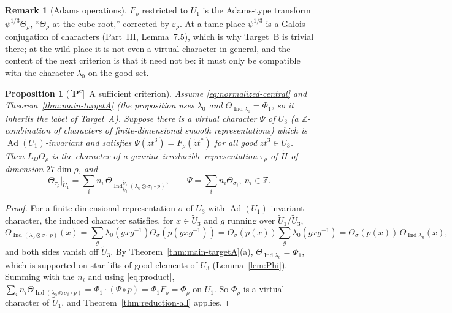 \documentclass[11pt]{article}
\newcommand{\Z}{\mathbb Z}
\newcommand{\Ind}{\operatorname{Ind}}
\newcommand{\Ad}{\operatorname{Ad}}
\newcommand{\tH}{\widetilde H}
\newcommand{\tU}{\widetilde U}
\newcommand{\Pctag}{\textnormal{\textbf{[P$^{\mathrm c}$]}}}
\theoremstyle{plain}
\newtheorem{proposition}[theorem]{Proposition}
\theoremstyle{definition}
\newtheorem{remark}[theorem]{Remark}
\begin{document}
\begin{remark}[Adams operations]
$F_\rho$ restricted to $\tU_1$ is the Adams-type transform
$\psi^{1/3}\Theta_\rho$, ``$\Theta_\rho$ at the cube root,'' corrected by
$\varepsilon_\rho$.  At a tame place $\psi^{1/3}$ is a Galois conjugation
of characters (Part~III, Lemma~7.5), which is why Target~B is trivial
there; at the wild place it is not even a virtual character in general,
and the content of the next criterion is that it need not be: it must
only be compatible with the character $\lambda_0$ on the good set.
\end{remark}

\begin{proposition}[\Pctag\ A sufficient criterion]\label{prop:criterion}
Assume \eqref{eq:normalized-central} and Theorem~\ref{thm:main-targetA}
(the proposition uses $\lambda_0$ and $\Theta_{\Ind\lambda_0}=\Phi_1$, so
it inherits the label of Target~A).  Suppose there is a virtual
character $\Psi$ of $U_3$ (a $\Z$-combination of characters of
finite-dimensional smooth representations) which is $\Ad(U_1)$-invariant
and satisfies $\Psi(zt^3)=F_\rho(\tilde zt^*)$ for all good $zt^3\in U_3$.
Then $L_D\Theta_\rho$ is the character of a genuine irreducible
representation $\tau_\rho$ of $\tH$ of dimension $27\dim\rho$, and
\begin{equation}\label{eq:tau-rho}
 \Theta_{\tau_\rho}|_{\tU_1}=\sum_i n_i\,\Theta_{\Ind_{\tU_3}^{\tU_1}(\lambda_0\otimes\sigma_i\circ p)},
 \qquad \Psi=\sum_i n_i\Theta_{\sigma_i},\ n_i\in\Z .
\end{equation}
\end{proposition}
\begin{proof}
For a finite-dimensional representation $\sigma$ of $U_3$ with
$\Ad(U_1)$-invariant character, the induced character satisfies, for
$x\in\tU_3$ and $g$ running over $\tU_1/\tU_3$,
\[
 \Theta_{\Ind(\lambda_0\otimes\sigma\circ p)}(x)=\sum_g\lambda_0(gxg^{-1})\Theta_\sigma(p(gxg^{-1}))
 =\Theta_\sigma(p(x))\sum_g\lambda_0(gxg^{-1})=\Theta_\sigma(p(x))\,\Theta_{\Ind\lambda_0}(x),
\]
and both sides vanish off $\tU_3$.  By Theorem~\ref{thm:main-targetA}(a),
$\Theta_{\Ind\lambda_0}=\Phi_1$, which is supported on star lifts of good
elements of $U_3$ (Lemma~\ref{lem:Phi}).  Summing with the $n_i$ and
using \eqref{eq:product}, $\sum_in_i\Theta_{\Ind(\lambda_0\otimes\sigma_i\circ p)}=\Phi_1\cdot(\Psi\circ p)=\Phi_1F_\rho=\Phi_\rho$
on $\tU_1$.  So $\Phi_\rho$ is a virtual character of $\tU_1$, and
Theorem~\ref{thm:reduction-all} applies.
\end{proof}
\end{document}
